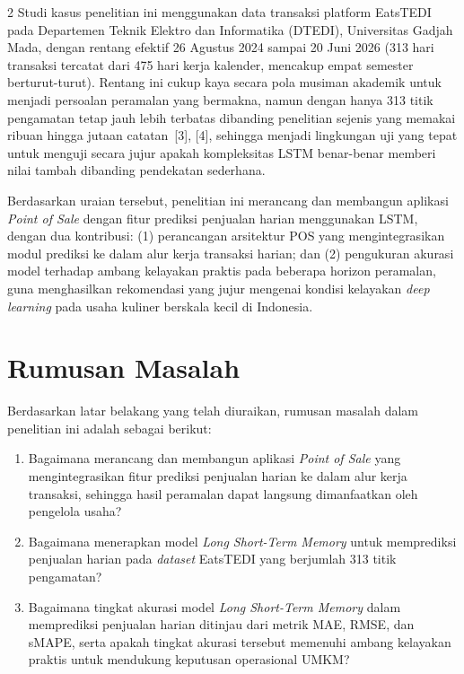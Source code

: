 \documentclass[12pt, a4paper, onecolumn, oneside]{report}
\begin{document}
\begin{spacing}{2}
Studi kasus penelitian ini menggunakan data transaksi platform EatsTEDI pada Departemen Teknik Elektro dan Informatika (DTEDI), Universitas Gadjah Mada, dengan rentang efektif 26 Agustus 2024 sampai 20 Juni 2026 (313 hari transaksi tercatat dari 475 hari kerja kalender, mencakup empat semester berturut-turut). Rentang ini cukup kaya secara pola musiman akademik untuk menjadi persoalan peramalan yang bermakna, namun dengan hanya 313 titik pengamatan tetap jauh lebih terbatas dibanding penelitian sejenis yang memakai ribuan hingga jutaan catatan~[3], [4], sehingga menjadi lingkungan uji yang tepat untuk menguji secara jujur apakah kompleksitas LSTM benar-benar memberi nilai tambah dibanding pendekatan sederhana.

Berdasarkan uraian tersebut, penelitian ini merancang dan membangun aplikasi \textit{Point of Sale} dengan fitur prediksi penjualan harian menggunakan LSTM, dengan dua kontribusi: (1) perancangan arsitektur POS yang mengintegrasikan modul prediksi ke dalam alur kerja transaksi harian; dan (2) pengukuran akurasi model terhadap ambang kelayakan praktis pada beberapa horizon peramalan, guna menghasilkan rekomendasi yang jujur mengenai kondisi kelayakan \textit{deep learning} pada usaha kuliner berskala kecil di Indonesia.

\section{Rumusan Masalah}
Berdasarkan latar belakang yang telah diuraikan, rumusan masalah dalam penelitian ini adalah sebagai berikut:
\begin{enumerate}
    \item Bagaimana merancang dan membangun aplikasi \textit{Point of Sale} yang mengintegrasikan fitur prediksi penjualan harian ke dalam alur kerja transaksi, sehingga hasil peramalan dapat langsung dimanfaatkan oleh pengelola usaha?
    \item Bagaimana menerapkan model \textit{Long Short-Term Memory} untuk memprediksi penjualan harian pada \textit{dataset} EatsTEDI yang berjumlah 313 titik pengamatan?
    \item Bagaimana tingkat akurasi model \textit{Long Short-Term Memory} dalam memprediksi penjualan harian ditinjau dari metrik MAE, RMSE, dan sMAPE, serta apakah tingkat akurasi tersebut memenuhi ambang kelayakan praktis untuk mendukung keputusan operasional UMKM?
\end{enumerate}


\end{spacing}
\end{document}
